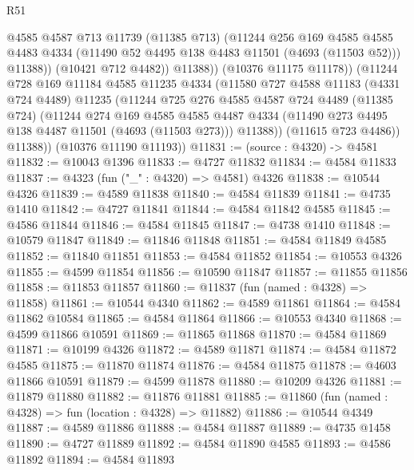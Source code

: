 \begin{lexlean}{R51}
\begin{coremodule}
                  @4585
                  @4587
                  @713
                  @11739
                  (@11385 @713)
                  (@11244
                    @256
                    @169
                    @4585
                    @4585
                    @4483
                    @4334
                    (@11490 @52 @4495 @138 @4483 @11501 (@4693 (@11503 @52)))
                    @11388))
                (@10421 @712 @4482))
              @11388))
          (@10376 @11175 @11178))
        (@11244
          @728
          @169
          @11184
          @4585
          @11235
          @4334
          (@11580
            @727
            @4588
            @11183
            (@4331 @724 @4489)
            @11235
            (@11244
              @725
              @276
              @4585
              @4587
              @724
              @4489
              (@11385 @724)
              (@11244
                @274
                @169
                @4585
                @4585
                @4487
                @4334
                (@11490 @273 @4495 @138 @4487 @11501 (@4693 (@11503 @273)))
                @11388))
            (@11615 @723 @4486))
          @11388))
      (@10376 @11190 @11193))
@11831 := (source : @4320) -> @4581
@11832 := @10043 @1396
@11833 := @4727 @11832
@11834 := @4584 @11833
@11837 := @4323 (fun ("_" : @4320) => @4581) @4326
@11838 := @10544 @4326
@11839 := @4589 @11838
@11840 := @4584 @11839
@11841 := @4735 @1410
@11842 := @4727 @11841
@11844 := @4584 @11842 @4585
@11845 := @4586 @11844
@11846 := @4584 @11845
@11847 := @4738 @1410
@11848 := @10579 @11847
@11849 := @11846 @11848
@11851 := @4584 @11849 @4585
@11852 := @11840 @11851
@11853 := @4584 @11852
@11854 := @10553 @4326
@11855 := @4599 @11854
@11856 := @10590 @11847
@11857 := @11855 @11856
@11858 := @11853 @11857
@11860 := @11837 (fun (named : @4328) => @11858)
@11861 := @10544 @4340
@11862 := @4589 @11861
@11864 := @4584 @11862 @10584
@11865 := @4584 @11864
@11866 := @10553 @4340
@11868 := @4599 @11866 @10591
@11869 := @11865 @11868
@11870 := @4584 @11869
@11871 := @10199 @4326
@11872 := @4589 @11871
@11874 := @4584 @11872 @4585
@11875 := @11870 @11874
@11876 := @4584 @11875
@11878 := @4603 @11866 @10591
@11879 := @4599 @11878
@11880 := @10209 @4326
@11881 := @11879 @11880
@11882 := @11876 @11881
@11885 := @11860 (fun (named : @4328) => fun (location : @4328) => @11882)
@11886 := @10544 @4349
@11887 := @4589 @11886
@11888 := @4584 @11887
@11889 := @4735 @1458
@11890 := @4727 @11889
@11892 := @4584 @11890 @4585
@11893 := @4586 @11892
@11894 := @4584 @11893

\end{coremodule}
\end{lexlean}
